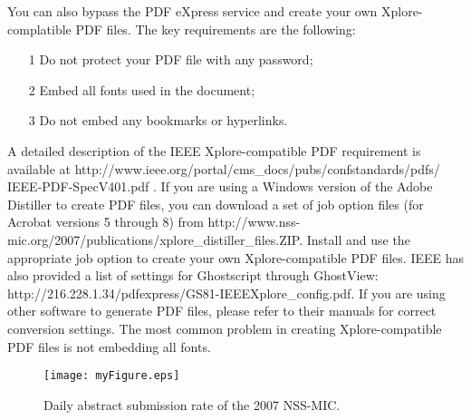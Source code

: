 \documentclass[journal]{IEEEtran}
\begin{document}
You can also bypass the PDF eXpress service and create your own Xplore-complatible PDF files.  The key requirements are the following:
\begin{itemize}
\item[1]	Do not protect your PDF file with any password;
\item[2]	Embed all fonts used in the document;
\item[3]	Do not embed any bookmarks or hyperlinks.
\end{itemize}

A detailed description of the IEEE Xplore-compatible PDF requirement is available at http://www.ieee.org/portal/cms\_docs/pubs/confstandards/pdfs/ IEEE-PDF-SpecV401.pdf \cite{IEEEPDFRequirement401}.  If you are using a Windows version of the Adobe Distiller to create PDF files, you can download a set of job option files (for Acrobat versions 5 through 8) from http://www.nss-mic.org/2007/publications/xplore\_distiller\_files.ZIP. Install and use the appropriate job option to create your own Xplore-compatible PDF files.  IEEE has also provided a list of settings for Ghostscript through GhostView: http://216.228.1.34/pdfexpress/GS81-IEEEXplore\_config.pdf.
If you are using other software to generate PDF files, please refer to their manuals for correct conversion settings.  The most common problem in creating Xplore-compatible PDF files is not embedding all fonts.



%
%
\begin{figure}[!t]
\centering
\texttt{[image: myFigure.eps]}
\caption{Daily abstract submission rate of the 2007 NSS-MIC. }
\label{fig_sim}
\end{figure}
\end{document}
